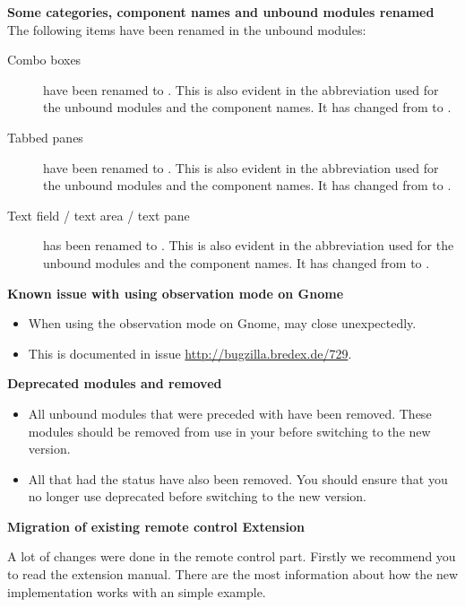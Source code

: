 \textbf{Some categories, component names and unbound modules renamed}
The following items have been renamed in the unbound modules:
\begin{description}
\item [Combo boxes]{ have been renamed to . This is also evident in the abbreviation used for the unbound modules and the component names. It has changed from  to .}
\item [Tabbed panes]{ have been renamed to . This is also evident in the abbreviation used for the unbound modules and the component names. It has changed from  to .}
\item [Text field / text area / text pane]{ has been renamed to . This is also evident in the abbreviation used for the unbound modules and the component names. It has changed from  to .}
\end{description}

\textbf{Known issue with using observation mode on Gnome}
\begin{itemize}
\item When using the observation mode on Gnome, \app{} may close unexpectedly. 
\item This is documented in issue \url{http://bugzilla.bredex.de/729}.
\end{itemize}

\textbf{Deprecated modules and \gdsteps{} removed}
\begin{itemize}
\item All unbound modules that were preceded with  have been removed. These modules should be removed from use in your \gdprojects{} before switching to the new version. 
\item All \gdsteps{} that had the status  have also been removed. You should ensure that you no longer use deprecated \gdsteps{} before switching to the new version. 
\end{itemize}

\textbf{Migration of existing remote control Extension}

A lot of changes were done in the remote control part. Firstly we recommend you
to read the extension manual. There are the most information about how the new
implementation works with an simple example.

